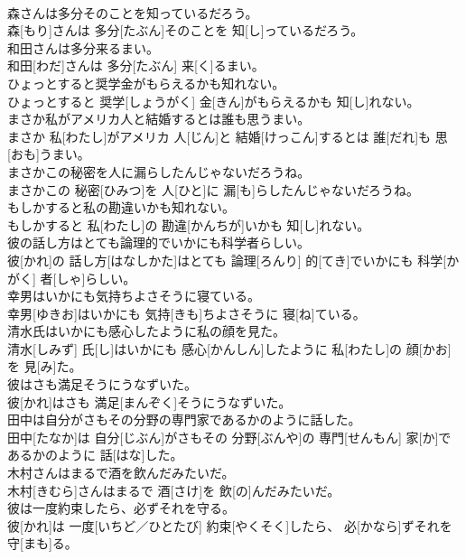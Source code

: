 \documentclass[8pt]{extreport}
\begin{document}
\begin{CJK}{UTF8}{min}
\\	森さんは多分そのことを知っているだろう。	
\\	森[もり]さんは 多分[たぶん]そのことを 知[し]っているだろう。
\\	和田さんは多分来るまい。	
\\	和田[わだ]さんは 多分[たぶん] 来[く]るまい。
\\	ひょっとすると奨学金がもらえるかも知れない。	
\\	ひょっとすると 奨学[しょうがく] 金[きん]がもらえるかも 知[し]れない。
\\	まさか私がアメリカ人と結婚するとは誰も思うまい。	
\\	まさか 私[わたし]がアメリカ 人[じん]と 結婚[けっこん]するとは 誰[だれ]も 思[おも]うまい。
\\	まさかこの秘密を人に漏らしたんじゃないだろうね。	
\\	まさかこの 秘密[ひみつ]を 人[ひと]に 漏[も]らしたんじゃないだろうね。
\\	もしかすると私の勘違いかも知れない。	
\\	もしかすると 私[わたし]の 勘違[かんちが]いかも 知[し]れない。
\\	彼の話し方はとても論理的でいかにも科学者らしい。	
\\	彼[かれ]の 話し方[はなしかた]はとても 論理[ろんり] 的[てき]でいかにも 科学[かがく] 者[しゃ]らしい。
\\	幸男はいかにも気持ちよさそうに寝ている。	
\\	幸男[ゆきお]はいかにも 気持[きも]ちよさそうに 寝[ね]ている。
\\	清水氏はいかにも感心したように私の顔を見た。	
\\	清水[しみず] 氏[し]はいかにも 感心[かんしん]したように 私[わたし]の 顔[かお]を 見[み]た。
\\	彼はさも満足そうにうなずいた。	
\\	彼[かれ]はさも 満足[まんぞく]そうにうなずいた。
\\	田中は自分がさもその分野の専門家であるかのように話した。	
\\	田中[たなか]は 自分[じぶん]がさもその 分野[ぶんや]の 専門[せんもん] 家[か]であるかのように 話[はな]した。
\\	木村さんはまるで酒を飲んだみたいだ。	
\\	木村[きむら]さんはまるで 酒[さけ]を 飲[の]んだみたいだ。
\\	彼は一度約束したら、必ずそれを守る。	
\\	彼[かれ]は 一度[いちど／ひとたび] 約束[やくそく]したら、 必[かなら]ずそれを 守[まも]る。

\end{CJK}
\end{document}
